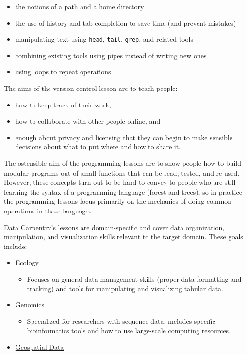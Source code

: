 \begin{itemize}
\item
  the notions of a path and a home directory
\item
  the use of history and tab completion to save time (and prevent
  mistakes)
\item
  manipulating text using \texttt{head}, \texttt{tail}, \texttt{grep},
  and related tools
\item
  combining existing tools using pipes instead of writing new ones
\item
  using loops to repeat operations
\end{itemize}

The aims of the version control lesson are to teach people:

\begin{itemize}
\item
  how to keep track of their work,
\item
  how to collaborate with other people online, and
\item
  enough about privacy and licensing that they can begin to make
  sensible decisions about what to put where and how to share it.
\end{itemize}

The ostensible aim of the programming lessons are to show people how to
build modular programs out of small functions that can be read, tested,
and re-used. However, these concepts turn out to be hard to convey to
people who are still learning the syntax of a programming language
(forest and trees), so in practice the programming lessons focus
primarily on the mechanics of doing common operations in those
languages.


Data Carpentry's \href{http://datacarpentry.org/lessons/}{lessons}
are domain-specific and cover data organization, manipulation, and
visualization skills relevant to the target domain. These goals include:

\begin{itemize}
\item
  \href{http://datacarpentry.org/lessons/\#ecology-workshop}{Ecology}

  \begin{itemize}
    \item
    Focuses on general data management skills (proper data formatting
    and tracking) and tools for manipulating and visualizing tabular
    data.
  \end{itemize}
\item
  \href{http://datacarpentry.org/lessons/\#genomics-workshop}{Genomics}

  \begin{itemize}
    \item
    Specialized for researchers with sequence data, includes specific
    bioinformatics tools and how to use large-scale computing
    resources.
  \end{itemize}
\item
  \href{http://datacarpentry.org/lessons/\#geospatial-data-workshop}{Geospatial
  Data}
\end{itemize}

